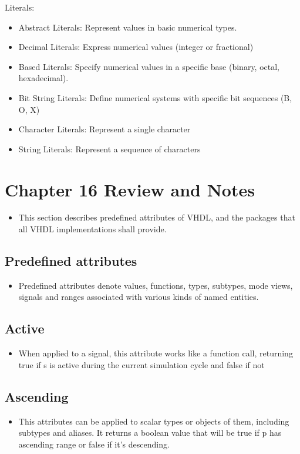 \documentclass[a4paper,12pt]{article}
\begin{document}
	Literals:
	\begin{itemize}
		\item Abstract Literals: Represent values in basic numerical types.
		\item Decimal Literals: Express numerical values (integer or fractional)
		\item Based Literals: Specify numerical values in a specific base (binary, octal, hexadecimal).
		\item Bit String Literals: Define numerical systems with specific bit sequences (B, O, X)
		\item Character Literals: Represent a single character
		\item String Literals: Represent a sequence of characters
	\end{itemize}
	
	
	
	
	\section*{Chapter 16 Review and Notes}
	\begin{itemize}
		\item This section describes predefined attributes of VHDL, and the packages that all VHDL implementations shall provide.
	\end{itemize}
	
	\subsection*{Predefined attributes}
	\begin{itemize}
		\item Predefined attributes denote values, functions, types, subtypes, mode views, signals and ranges associated with various kinds of named entities.
	\end{itemize}
	
	
	\subsection*{Active}
	\begin{itemize}
		\item When applied to a signal, this attribute works like a function call, returning true if s is active during the current simulation cycle and false if not
	\end{itemize}
	
	\subsection*{Ascending}
	\begin{itemize}
		\item This attributes can be applied to scalar types or objects of them, including subtypes and aliases. It returns a boolean value that will be true if p has ascending range or false if it's descending.
	\end{itemize}
	
\end{document}
